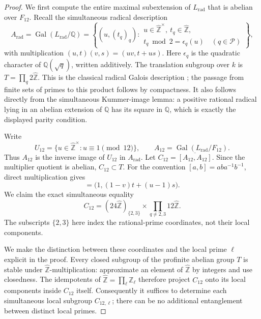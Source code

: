 \begin{proof}
We first compute the entire maximal subextension of $L_{\mathrm{rad}}$
that is abelian over $F_{12}$.  Recall the simultaneous radical
description
\[
 A_{\mathrm{rad}}=\operatorname{Gal}(L_{\mathrm{rad}}/\mathbb Q)
 =
 \left\{(u,(t_q)_q):
 \begin{array}{l}
 u\in\widehat{\mathbb Z}^{\times},\
 t_q\in\widehat{\mathbb Z},\\
 t_q\bmod2=\epsilon_q(u)\quad(q\in\mathcal P)
 \end{array}\right\},
\]
with multiplication $(u,t)(v,s)=(uv,t+us)$.
Here $\epsilon_q$ is the quadratic character of $\mathbb Q(\sqrt q)$,
written additively.  The translation subgroup over $k$ is
$T=\prod_q2\widehat{\mathbb Z}$.
This is the classical radical Galois description
\cite[\S2, Theorem~2.5]{MoreeStevenhagen}; the passage from finite
sets of primes to this product follows by compactness.
It also follows directly from the simultaneous Kummer-image lemma:
a positive rational radical lying in an abelian extension of
$\mathbb Q$ has its square in $\mathbb Q$, which is exactly the
displayed parity condition.

Write
\[
 U_{12}=\{u\in\widehat{\mathbb Z}^{\times}:u\equiv1\pmod{12}\},
 \qquad A_{12}=\operatorname{Gal}(L_{\mathrm{rad}}/F_{12}).
\]
Thus $A_{12}$ is the inverse image of $U_{12}$ in $A_{\mathrm{rad}}$.
Let $C_{12}=\overline{[A_{12},A_{12}]}$.  Since the multiplier quotient is
abelian, $C_{12}\subset T$.  For the convention
$[a,b]=aba^{-1}b^{-1}$, direct multiplication gives
\begin{equation}
 [(u,t),(v,s)]=
 \bigl(1,(1-v)t+(u-1)s\bigr).
 \label{eq:radical-cm-affine-commutator}
\end{equation}
We claim the exact simultaneous equality
\begin{equation}
 C_{12}=(24\widehat{\mathbb Z})_{\{2,3\}}\times
             \prod_{q\ne2,3}12\widehat{\mathbb Z}.
 \label{eq:radical-cm-derived-subgroup}
\end{equation}
The subscripts $\{2,3\}$ here index the rational-prime coordinates,
not their local components.

We make the distinction between these coordinates and the local
prime $\ell$ explicit in the proof.  Every closed subgroup of the
profinite abelian group $T$ is stable under
$\widehat{\mathbb Z}$-multiplication: approximate an element of
$\widehat{\mathbb Z}$ by integers and use closedness.
The idempotents of $\widehat{\mathbb Z}=\prod_\ell\mathbb Z_\ell$
therefore project $C_{12}$ onto its local components inside $C_{12}$ itself.
Consequently it suffices to determine each simultaneous local
subgroup $C_{12,\ell}$; there can be no additional entanglement between
distinct local primes.


\end{proof}
